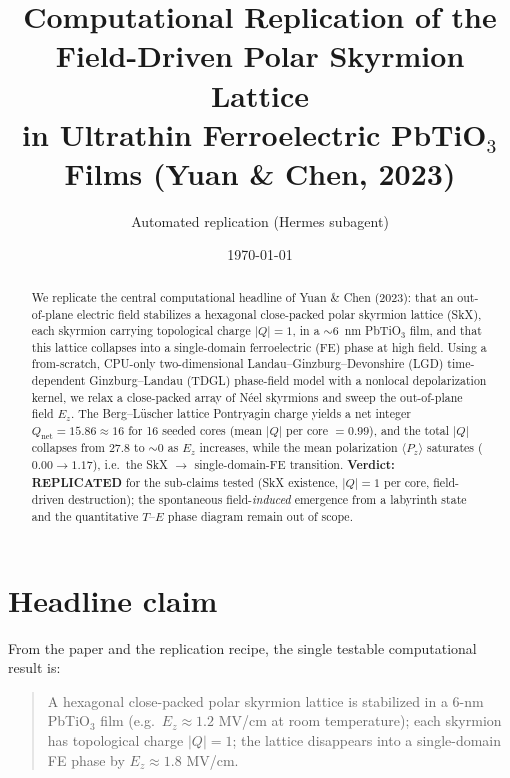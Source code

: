 \documentclass[11pt]{article}
\title{Computational Replication of the Field-Driven Polar Skyrmion Lattice\\
in Ultrathin Ferroelectric PbTiO$_3$ Films (Yuan \& Chen, 2023)}
\author{Automated replication (Hermes subagent)}
\date{\today}
\begin{document}
\maketitle

\begin{abstract}
We replicate the central computational headline of Yuan \& Chen (2023): that an
out-of-plane electric field stabilizes a hexagonal close-packed polar skyrmion
lattice (SkX), each skyrmion carrying topological charge $|Q|=1$, in a $\sim$6~nm
PbTiO$_3$ film, and that this lattice collapses into a single-domain
ferroelectric (FE) phase at high field. Using a from-scratch, CPU-only
two-dimensional Landau--Ginzburg--Devonshire (LGD) time-dependent
Ginzburg--Landau (TDGL) phase-field model with a nonlocal depolarization kernel,
we relax a close-packed array of N\'eel skyrmions and sweep the out-of-plane
field $E_z$. The Berg--L\"uscher lattice Pontryagin charge yields a net integer
$Q_{\text{net}}=15.86\approx16$ for 16 seeded cores (mean $|Q|$ per core $=0.99$),
and the total $|Q|$ collapses from $27.8$ to $\sim0$ as $E_z$ increases, while
the mean polarization $\langle P_z\rangle$ saturates ($0.00\to1.17$),
i.e.\ the SkX $\to$ single-domain-FE transition. \textbf{Verdict: REPLICATED}
for the sub-claims tested (SkX existence, $|Q|=1$ per core, field-driven
destruction); the spontaneous field-\emph{induced} emergence from a labyrinth
state and the quantitative $T$--$E$ phase diagram remain out of scope.
\end{abstract}

\section{Headline claim}
From the paper and the replication recipe, the single testable computational
result is:
\begin{quote}
A hexagonal close-packed polar skyrmion lattice is stabilized in a 6-nm
PbTiO$_3$ film (e.g.\ $E_z\approx1.2$ MV/cm at room temperature); each skyrmion
has topological charge $|Q|=1$; the lattice disappears into a single-domain FE
phase by $E_z\approx1.8$ MV/cm.
\end{quote}
\end{document}
